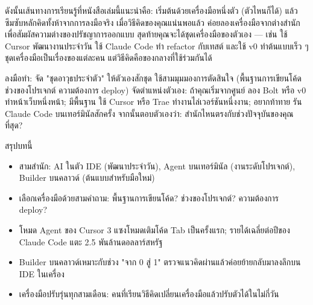 ดังนั้นเส้นทางการเรียนรู้ที่หนังสือเล่มนี้แนะนำคือ: เริ่มต้นด้วยเครื่องมือหนึ่งตัว (ตัวไหนก็ได้) แล้วซึมซับหลักคิดทั้งห้าจากการลงมือจริง เมื่อวิธีคิดของคุณแน่นพอแล้ว ค่อยลองเครื่องมือจากต่างสำนัก เพื่อสัมผัสความต่างของปรัชญาการออกแบบ สุดท้ายคุณจะได้ชุดเครื่องมือของตัวเอง — เช่น ใช้ Cursor พัฒนางานประจำวัน ใช้ Claude Code ทำ refactor กับเทสต์ และใช้ v0 ทำต้นแบบเร็ว ๆ ชุดเครื่องมือเป็นเรื่องของแต่ละคน แต่วิธีคิดคือของกลางที่ใช้ร่วมกันได้

\begin{tcbpractice}{ลงมือทำ: จัด "ชุดอาวุธประจำตัว" ให้ตัวเองสักชุด}
ใช้สามมุมมองการตัดสินใจ (พื้นฐานการเขียนโค้ด ช่วงของโปรเจกต์ ความต้องการ deploy) จัดตำแหน่งตัวเอง: ถ้าคุณเริ่มจากศูนย์ ลอง Bolt หรือ v0 ทำหน้าเว็บหนึ่งหน้า; มีพื้นฐาน ใช้ Cursor หรือ Trae ทำงานไล่เวอร์ชันหนึ่งงาน; อยากท้าทาย รัน Claude Code บนเทอร์มินัลสักครั้ง จากนั้นตอบตัวเองว่า: สำนักไหนตรงกับช่วงปัจจุบันของคุณที่สุด?

\end{tcbpractice}

\begin{tcbsummary}{สรุปบทนี้}
\begin{itemize}
  \item สามสำนัก: AI ในตัว IDE (พัฒนาประจำวัน), Agent บนเทอร์มินัล (งานระดับโปรเจกต์), Builder บนคลาวด์ (ต้นแบบสำหรับมือใหม่)
  \item เลือกเครื่องมือด้วยสามคำถาม: พื้นฐานการเขียนโค้ด? ช่วงของโปรเจกต์? ความต้องการ deploy?
  \item โหมด Agent ของ Cursor 3 แซงโหมดเติมโค้ด Tab เป็นครั้งแรก; รายได้เฉลี่ยต่อปีของ Claude Code แตะ 2.5 พันล้านดอลลาร์สหรัฐ
  \item Builder บนคลาวด์เหมาะกับช่วง "จาก 0 สู่ 1" ตรวจแนวคิดผ่านแล้วค่อยย้ายกลับมาลงลึกบน IDE ในเครื่อง
  \item เครื่องมือปรับรุ่นทุกสามเดือน: คนที่เรียนวิธีคิดเปลี่ยนเครื่องมือแล้วปรับตัวได้ในไม่กี่วัน
\end{itemize}

\end{tcbsummary}
